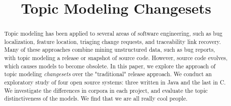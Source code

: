 \documentclass[conference]{IEEEtran}
\begin{document}
\title{Topic Modeling Changesets}
\author{

    \and


    \and

}


\maketitle

\begin{abstract}

Topic modeling has been applied to several areas of software engineering,
such as bug localization, feature location, triaging change requests,
and traceability link recovery.
Many of these approaches combine mining unstructured data, such as bug
reports, with topic modeling a release or snapshot of source code.
However, source code evolves, which causes models to become obsolete.
In this paper, we explore the approach of topic modeling \emph{changesets}
over the "traditional" release approach.
We conduct an exploratory study of four open source systems:
three written in Java and the last in C.
We investigate the differences in corpora in each project,
and evaluate the topic distinctiveness of the models.
We find that we are all really cool people.

\end{abstract}

\begin{IEEEkeywords}
\end{IEEEkeywords}
\end{document}
